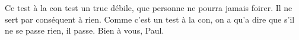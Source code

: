  {Ce test à la con test un truc débile, que personne ne pourra jamais foirer. Il ne sert par conséquent à rien.}
{Comme c'est un test à la con, on a qu'a dire que s'il ne se passe rien, il
    passe. Bien à vous, Paul.}
